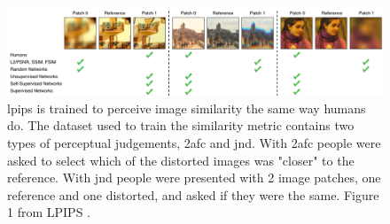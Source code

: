 \begin{figure}[ht]
    \centering
    \includegraphics[width=1.0\textwidth]{figures/lpips.png}
    \caption[LPIPS - Learned Perceptual Image Patch Similarity]{\acrshort{lpips} is trained to perceive image similarity the same way humans do. The dataset used to train the similarity metric contains two types of perceptual judgements, \acrshort{2afc} and \acrshort{jnd}. With \acrshort{2afc} people were asked to select which of the distorted images was "closer" to the reference. With \acrshort{jnd} people were presented with 2 image patches, one reference and one distorted, and asked if they were the same. Figure 1 from LPIPS \cite{zhang_unreasonable_2018}.}
    \label{fig:lpips}
\end{figure}

